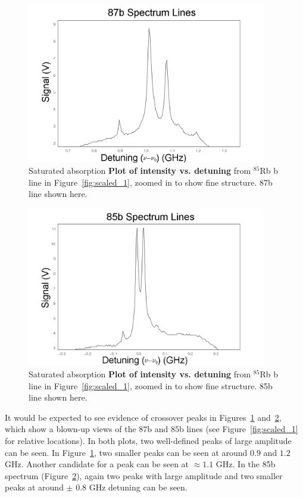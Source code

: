 \documentclass[paper=a4, fontsize=11pt]{scrartcl} %
\numberwithin{equation}{section}
\numberwithin{figure}{section}
\numberwithin{table}{section}
\begin{document}
\begin{figure}[h] \begin{center}
  \includegraphics[height=70mm]{detune1.png}
  \caption{Saturated absorption \textbf{Plot of intensity
      vs. detuning} from $^{85}$Rb b line in
    Figure~\ref{fig:scaled_1}, zoomed in to show fine structure. 87b
    line shown here.}
  \label{fig:det1}
\end{center} \end{figure}

\begin{figure}[h] \begin{center}
  \includegraphics[height=70mm]{detune2.png}
  \caption{Saturated absorption \textbf{Plot of intensity vs. detuning} from $^{85}$Rb b line in
    Figure~\ref{fig:scaled_1}, zoomed in to show fine structure. 85b
    line shown here.}
  \label{fig:det2}
\end{center} \end{figure}

It would be expected to see evidence of crossover peaks in
Figures~\ref{fig:det1} and~\ref{fig:det2}, which show a blown-up
views of the $87$b and $85$b lines (see Figure~\ref{fig:scaled_1} for relative locations). In both plots, two well-defined peaks of large amplitude can be seen. In Figure~\ref{fig:det1}, two smaller peaks can be seen at around $0.9$ and $1.2$ GHz. Another candidate for a peak can be seen at $\approx 1.1$ GHz. In the 85b spectrum (Figure~\ref{fig:det2}), again two peaks
with large amplitude and two smaller peaks at around $\pm$ 0.8 GHz
detuning can be seen.
\end{document}
